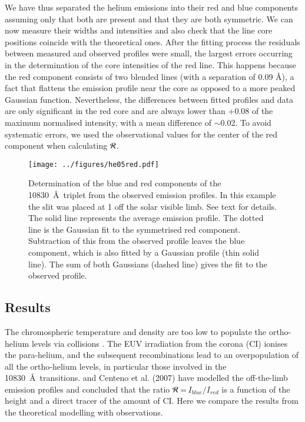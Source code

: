We have thus separated the helium emissions into their red and blue
components  assuming only that both are present and that they are both symmetric. We can now measure their widths and intensities and also check that the line core positions coincide with the theoretical ones. After the fitting process the residuals
between measured and observed profiles were small, the largest errors occurring
in the determination of the core intensities of the red line. This happens because the red component consists of two blended lines (with a separation of 0.09 \AA), a fact that flattens the emission profile near the core as opposed to a more peaked Gaussian function. Nevertheless, the differences between fitted profiles
and data are only significant in the red core and are always lower than
+0.08 of the maximum normalised intensity, with a mean difference of $\sim$0.02. To avoid systematic errors, we used the observational values for the center of
the red component when calculating $\cal R$. 


\begin{figure}[t]
\center \texttt{[image: ../figures/he05red.pdf]} 
\caption{Determination of the blue and red components of the  
10830~\AA\ triplet from the observed emission profiles. In this example the
 slit was placed at 1 off the solar visible limb. See text for details. 
  The solid line {  represents} the average emission profile. The dotted line is the Gaussian fit to the symmetrised red
  component. Subtraction of this from the observed profile leaves the blue
  component, which is also fitted by a Gaussian profile (thin solid line). 
The sum of both Gaussians (dashed line)  gives the fit to the 
observed profile.}
\label{fig:ajuste}
\end{figure}

\subsection{Results}%
The chromospheric temperature and density are too low  to populate the
ortho-helium levels via collisions \citep{1994isp..book...35A}. The EUV irradiation from
the corona (CI) ionises the para-helium, and  
the subsequent recombinations lead to an overpopulation of all the 
ortho-helium levels, in particular those involved in the 10830~\AA\
transitions. \citet{Centeno06} and Centeno et al. (2007) have modelled the off-the-limb emission profiles and concluded that the ratio $\cal{R}$\,=\,$I_{blue}/I_{red}$ is a function of the height and a direct
tracer of the amount of CI. Here we compare the results from the theoretical modelling with observations.

